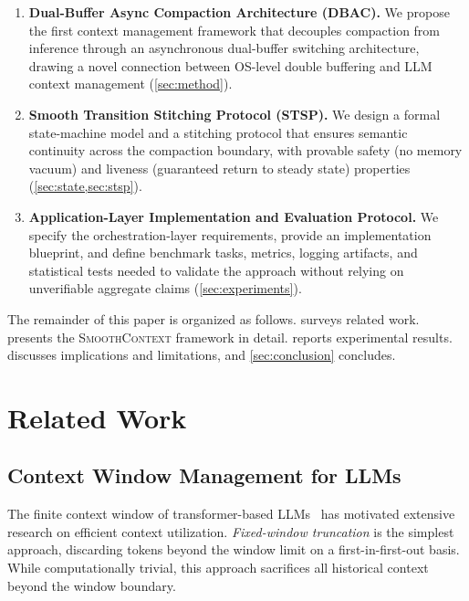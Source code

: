 \documentclass[10pt,twocolumn]{article}
\newcommand{\sys}{\textsc{SmoothContext}}
\begin{document}
\begin{enumerate}
  \item \textbf{Dual-Buffer Async Compaction Architecture (DBAC).}
  We propose the first context management framework that decouples compaction from inference through an asynchronous dual-buffer switching architecture, drawing a novel connection between OS-level double buffering and LLM context management (\cref{sec:method}).

  \item \textbf{Smooth Transition Stitching Protocol (STSP).}
  We design a formal state-machine model and a stitching protocol that ensures semantic continuity across the compaction boundary, with provable safety (no memory vacuum) and liveness (guaranteed return to steady state) properties (\cref{sec:state,sec:stsp}).

  \item \textbf{Application-Layer Implementation and Evaluation Protocol.}
  We specify the orchestration-layer requirements, provide an implementation blueprint, and define benchmark tasks, metrics, logging artifacts, and statistical tests needed to validate the approach without relying on unverifiable aggregate claims (\cref{sec:experiments}).
\end{enumerate}

The remainder of this paper is organized as follows.  surveys related work.  presents the \sys{} framework in detail.  reports experimental results.  discusses implications and limitations, and \cref{sec:conclusion} concludes.


\section{Related Work}\label{sec:related}

\subsection{Context Window Management for LLMs}

The finite context window of transformer-based LLMs~\cite{vaswani2017attention} has motivated extensive research on efficient context utilization. \emph{Fixed-window truncation} is the simplest approach, discarding tokens beyond the window limit on a first-in-first-out basis. While computationally trivial, this approach sacrifices all historical context beyond the window boundary.
\end{document}
